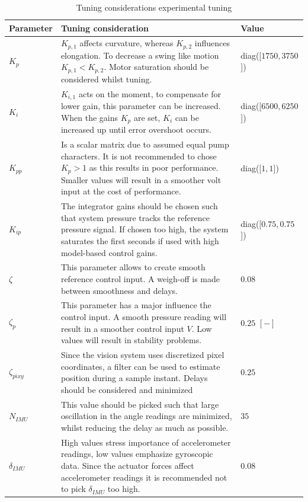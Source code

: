 \begin{table}[H]
    \centering
     \caption{Tuning considerations experimental tuning}
    \begin{tabular}{p{2.5cm} p{9cm} p{3cm}} \hline
      \textbf{Parameter}   & \textbf{Tuning  consideration} & \textbf{Value } \\ \hline
      $K_p$   &   $K_{p,1}$ affects curvature, whereas $K_{p,2}$ influences elongation. To decrease a swing like motion $K_{p,1} < K_{p,2}$. Motor saturation should be considered whilst tuning.   &  diag([$1750,3750$])            \\ \hline
      $K_i$   &   $K_{i,1}$ acts on the moment, to compensate for lower gain, this parameter can be increased. When the gains $K_p$ are set, $K_i$ can be increased up until error overshoot occurs.   &  diag([$6500,6250$])    \\ \hline
      $K_{pp}$   &  Is a scalar matrix due to assumed equal pump characters. It is not recommended to chose $K_p >1$ as this results in poor performance. Smaller values will result in a smoother volt input at the cost of performance.  &  diag([$1 ,1$])     \\ \hline
      $K_{ip}$   &  The integrator gains should be chosen such that system pressure tracks the reference pressure signal. If chosen too high, the system saturates the first seconds if used with high model-based control gains.    &  diag([$0.75,0.75$])    \\ \hline
      $\zeta$    &   This parameter allows to create smooth reference control input. A weigh-off is made between smoothness and delays. &  $0.08$  \\ \hline
      $\zeta_p$    &   This parameter has a major influence the control input. A smooth pressure reading will result in a smoother control input $V$. Low values will result in stability problems.   & $0.25$ $[-]$  \\ \hline
      $\zeta_{pixy}$    &  Since the vision system uses discretized pixel coordinates, a filter can be used to estimate position during a sample instant. Delays should be considered and minimized     & $0.25$   \\ \hline
      $N_{IMU}$    &  This value should be picked such that large oscillation in the angle readings are minimized, whilst reducing the delay as much as possible. & $35$   \\ \hline
      $\delta_{IMU}$    &  High values stress importance of accelerometer readings, low values emphasize gyroscopic data. Since the actuator forces affect accelerometer readings it is recommended not to pick $\delta_{IMU}$ too high.  & $0.08$  \\ \hline
    \end{tabular}
    \label{tab5:tuningcosiderations}
\end{table}



